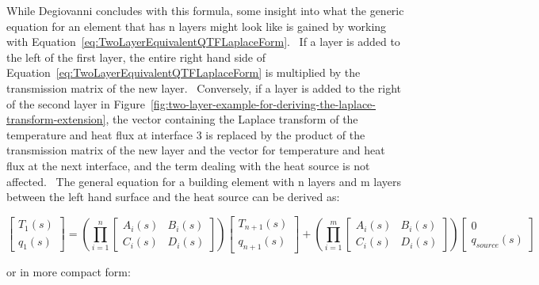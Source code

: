 While Degiovanni concludes with this formula, some insight into what the generic equation for an element that has n layers might look like is gained by working with Equation~\ref{eq:TwoLayerEquivalentQTFLaplaceForm}.~ If a layer is added to the left of the first layer, the entire right hand side of Equation~\ref{eq:TwoLayerEquivalentQTFLaplaceForm} is multiplied by the transmission matrix of the new layer.~ Conversely, if a layer is added to the right of the second layer in Figure~\ref{fig:two-layer-example-for-deriving-the-laplace-transform-extension}, the vector containing the Laplace transform of the temperature and heat flux at interface 3 is replaced by the product of the transmission matrix of the new layer and the vector for temperature and heat flux at the next interface, and the term dealing with the heat source is not affected.~ The general equation for a building element with n layers and m layers between the left hand surface and the heat source can be derived as:

\begin{equation}
\left[ {\begin{array}{*{20}{c}}{{T_1}\left( s \right)}\\ {{q_1}\left( s \right)}\end{array}} \right] = \left( {\prod\limits_{i = 1}^n {\left[ {\begin{array}{*{20}{c}}{{A_i}\left( s \right)}&{{B_i}\left( s \right)}\\ {{C_i}\left( s \right)}&{{D_i}\left( s \right)}\end{array}} \right]} } \right)\left[ {\begin{array}{*{20}{c}}{{T_{n + 1}}\left( s \right)}\\ {{q_{n + 1}}\left( s \right)}\end{array}} \right] + \left( {\prod\limits_{i = 1}^m {\left[ {\begin{array}{*{20}{c}}{{A_i}\left( s \right)}&{{B_i}\left( s \right)}\\ {{C_i}\left( s \right)}&{{D_i}\left( s \right)}\end{array}} \right]} } \right)\left[ {\begin{array}{*{20}{c}}0\\ {{q_{source}}\left( s \right)}\end{array}} \right]
\end{equation}

or in more compact form:

